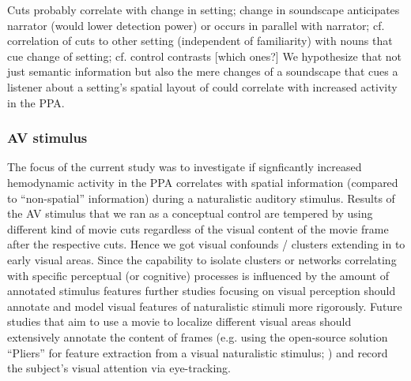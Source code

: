 \documentclass[english]{article}
\begin{document}
%
%
Cuts probably correlate with change in setting; change in soundscape anticipates
narrator (would lower detection power) or occurs in parallel with narrator; cf.
correlation of cuts to other setting (independent of familiarity) with nouns
that cue change of setting; cf. control contrasts [which ones?]
We hypothesize that not just semantic information but also the mere changes of a
soundscape that cues a listener about a setting's spatial layout of could
correlate with increased activity in the PPA.


\subsubsection{AV stimulus}



The focus of the current study was to investigate if signficantly increased
hemodynamic activity in the PPA correlates with spatial information (compared to
``non-spatial'' information) during a naturalistic auditory stimulus.
Results of the AV stimulus that we ran as a conceptual control are tempered by
using different kind of movie cuts regardless of the visual content of the movie
frame after the respective cuts.
Hence we got visual confounds / clusters extending in to early visual areas.
Since the capability to isolate clusters or networks correlating with specific
perceptual (or cognitive) processes is influenced by the amount of annotated
stimulus features further studies focusing on visual perception should annotate
and model visual features of naturalistic stimuli more rigorously.
Future studies that aim to use a movie to localize different visual areas should
extensively annotate the content of frames (e.g. using the open-source solution
``Pliers'' for feature extraction from a visual naturalistic stimulus;
\citep{mcnamara2017developing}) and record the subject's visual attention via
eye-tracking.
\end{document}
